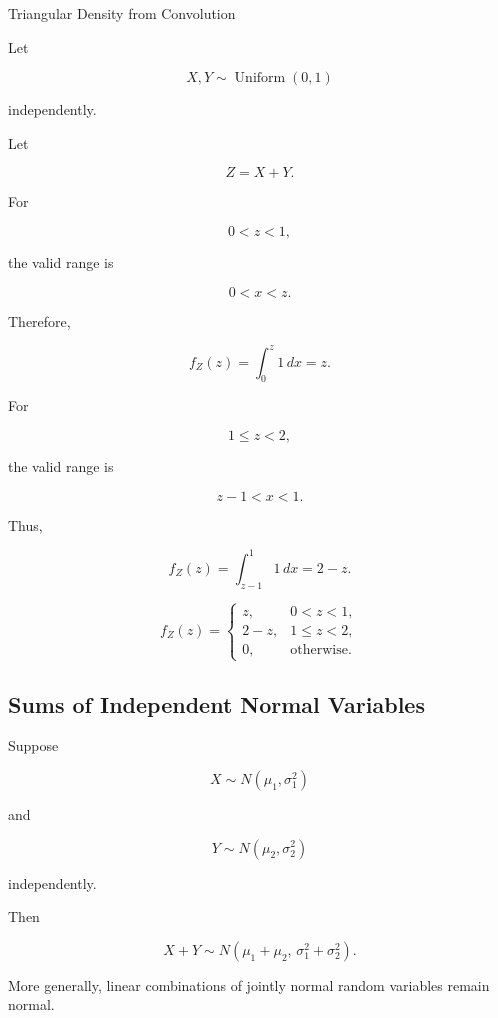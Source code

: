 \begin{workedexamplebox}{Triangular Density from Convolution}

Let

\[
X,Y
\sim
\operatorname{Uniform}(0,1)
\]

independently.

Let

\[
Z=X+Y.
\]

For

\[
0<z<1,
\]

the valid range is

\[
0<x<z.
\]

Therefore,

\[
f_Z(z)
=
\int_0^z
1\,dx
=
z.
\]

For

\[
1\leq z<2,
\]

the valid range is

\[
z-1<x<1.
\]

Thus,

\[
f_Z(z)
=
\int_{z-1}^{1}
1\,dx
=
2-z.
\]

\begin{answerbox}
\[
\boxed{
f_Z(z)
=
\begin{cases}
z,&0<z<1,\\
2-z,&1\leq z<2,\\
0,&\text{otherwise}.
\end{cases}
}
\]
\end{answerbox}

\end{workedexamplebox}

\subsection{Sums of Independent Normal Variables}
\label{subsec:sum-independent-normal}

Suppose

\[
X\sim N(\mu_1,\sigma_1^2)
\]

and

\[
Y\sim N(\mu_2,\sigma_2^2)
\]

independently.

Then

\[
\boxed{
X+Y
\sim
N
\left(
\mu_1+\mu_2,
\,
\sigma_1^2+\sigma_2^2
\right).
}
\]

More generally, linear combinations of jointly normal random variables
remain normal.

